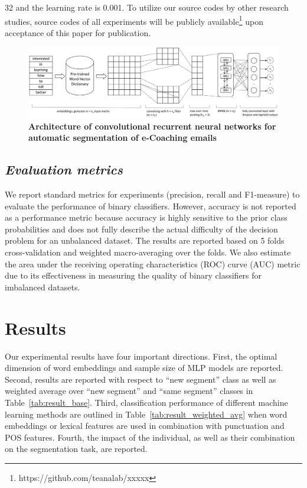 \documentclass{amia}
\begin{document}
32 and the learning rate is 0.001. To utilize our source codes by other research studies, source codes of all experiments will be publicly available\footnote{https://github.com/teanalab/xxxxx} upon acceptance of this paper for publication.

\begin{figure}[!htb]
    \centering
    \includegraphics[width=1.0\textwidth]{figures/CRNN.eps}
    \caption{\textbf{Architecture of convolutional recurrent neural networks for automatic segmentation of e-Coaching emails}}
    \label{fig:crnn}
\end{figure}
  
\subsection*{\textit{Evaluation metrics}}
We report standard metrics for experiments (precision, recall and F1-measure) to evaluate the performance of binary classifiers.\cite{aas1999text} However, accuracy is not reported as a performance metric because accuracy is highly sensitive to the prior class probabilities and does not fully describe the actual difficulty of the decision problem for an unbalanced dataset. The results are reported based on 5 folds cross-validation and weighted macro-averaging over the folds. We also estimate the area under the receiving operating characteristics (ROC) curve\cite{kumar2011receiver} (AUC) metric due to its effectiveness in measuring the quality of binary classifiers for imbalanced datasets. \cite{hu2015kernelized}

\section*{Results}
Our experimental results have four important directions. First, the optimal dimension of word embeddings and sample size of MLP models are reported. Second, results are reported with respect to ``new segment'' class as well as weighted average over ``new segment'' and ``same segment'' classes in Table~\ref{tab:result_base}. Third, classification performance of different machine learning methods are outlined in Table~\ref{tab:result_weighted_avg} when word embeddings or lexical features are used in combination with punctuation and POS features. Fourth, the impact of the individual, as well as their combination on the segmentation task, are reported.
\end{document}
